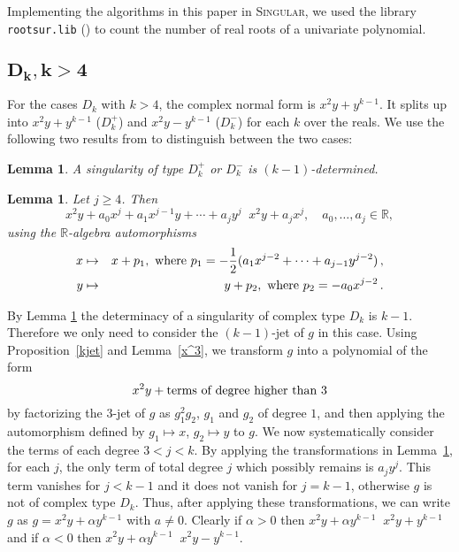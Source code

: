 \documentclass[noend]{amsproc}
\newtheorem{lemma}[theorem]{Lemma}
\DeclareMathOperator{\requiv}{\overset{r}{\sim}}
\begin{document}
Implementing the algorithms in this paper in \textsc{Singular}, we used the
library \texttt{rootsur.lib} (\cite{roots}) to count the number of real roots
of a univariate polynomial.

\subsection{$\boldsymbol{D_k, k > 4}$}

For the cases $D_k$ with $k > 4$, the complex normal form is $x^2y+y^{k-1}$. It
splits up into $x^2y+y^{k-1}$ ($D_k^+$) and $x^2y-y^{k-1}$ ($D_k^-$) for each
$k$ over the reals. We use the following two results from \cite{Siersma} to
distinguish between the two cases:

\begin{lemma}\label{kDeterminacyD[k]k>4}
A singularity of type $D_k^+$ or $D_k^-$ is $(k-1)$-determined.
\end{lemma}

\begin{lemma}\label{transformationD[k]}
Let $j\ge 4$. Then
\[
x^2y+a_0x^j+a_1x^{j-1}y+\cdots+a_jy^j\requiv x^2y+a_jx^j,
\quad a_0,\ldots,a_j\in\mathbb R,
\]
using the $\mathbb R$-algebra automorphisms
\begin{eqnarray*}
x&\mapsto&x+p_1,\textnormal{ where }
p_1=-\frac{1}{2}(a_1x^{j-2}+\cdots+a_{j-1}y^{j-2})\,,\\
y&\mapsto&y+p_2,\textnormal{ where } p_2=-a_0x^{j-2} \,.
\end{eqnarray*}
\end{lemma}

By Lemma \ref{kDeterminacyD[k]k>4} the determinacy of a singularity of  complex
type
$D_k$ is $k-1$. Therefore we only need to consider the
$(k-1)$-jet of $g$ in this case. Using Proposition~\ref{kjet} and
Lemma~\ref{x^3}, we transform $g$ into a polynomial of the form
\[x^2y+\textnormal{terms of degree higher than $3$}\]
by factorizing the $3$-jet of $g$ as $g_1^2g_2$, $g_1$ and $g_2$ of
degree $1$,
and then applying the automorphism defined by $g_1\mapsto x$, $g_2\mapsto y$ to
$g$. We
now systematically consider the terms of each degree $3<j<k$. By applying the
transformations in Lemma~\ref{transformationD[k]}, for each $j$, the only term
of total degree $j$ which possibly remains is $a_jy^j$. This term vanishes for
$j<k-1$ and it does not vanish for $j=k-1$, otherwise $g$ is not of complex
type $D_k$. Thus, after applying these transformations,
we can write $g$ as $g=x^2y+\alpha y^{k-1}$ with $a\neq0$. Clearly if
$\alpha>0$ then $x^2y+\alpha y^{k-1}\requiv x^2y+y^{k-1}$ and if $\alpha<0$
then $x^2y+\alpha y^{k-1}\requiv x^2y-y^{k-1}$.
\end{document}
